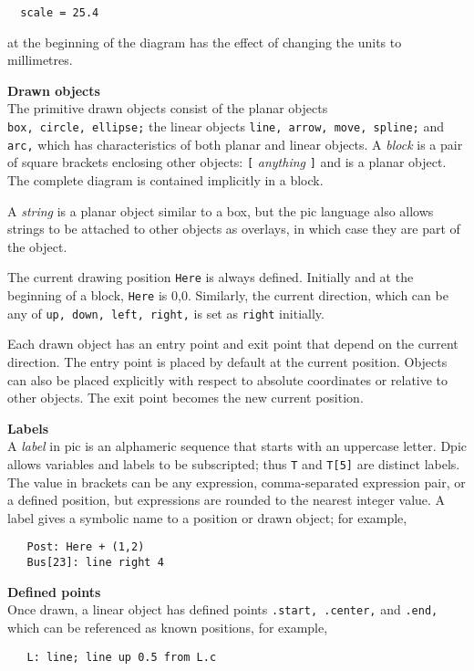 {\tt \ \ scale\ =\ 25.4}

at the beginning of the diagram has the effect of changing
the units to millimetres.
%
\par\hskip-2pc{\bf Drawn objects}\\
The primitive drawn objects consist of the planar objects
{\tt box,\ circle,\ ellipse;}
the linear objects
{\tt line,\ arrow,\ move,\ spline;}
and
{\tt arc,}
which has characteristics of both planar and linear objects.
A
{\it block}
is a pair of square brackets enclosing other objects:
{\tt [}
{\it anything}
{\tt ]}
and is a planar object.
The complete diagram is contained implicitly in a block.

A
{\it string}
is a planar object similar to a box,
but the
pic
language also allows strings to be attached to other objects as overlays,
in which case they are part of the object.

The current drawing position
{\tt Here}
is always defined. 
Initially and at the beginning of a block,
{\tt Here}
is 0,0.
Similarly, the current direction, which can be any of
{\tt up,\ down,\ left,\ right,}
is set as
{\tt right}
initially.

Each drawn object has an entry point and exit point that depend
on the current direction.
The entry point is placed by default at the current position. 
Objects can also be placed explicitly with respect to absolute
coordinates or relative to other objects.
The exit point becomes the new current position.
\par\hskip-2pc{\bf Labels}\\
A
{\it label}
in
pic
is an alphameric sequence that starts with an uppercase letter.
Dpic allows variables and labels to be subscripted; thus
{\tt T}
and
{\tt T[5]}
are distinct labels.
The value in brackets can be any expression, comma-separated
expression pair, or a defined position,
but expressions are rounded to the nearest integer value.
A label gives a symbolic name to a position or drawn object;
for example,

{\tt \ \ \ Post:\ Here\ +\ (1,2)}
\\\hbox{}\hskip-1pt
{\tt \ \ \ Bus[23]:\ line\ right\ 4}
\par\hskip-2pc{\bf Defined points}\\
Once drawn, a linear object has defined points
{\tt .start,\ .center,}
and
{\tt .end,}
which can be referenced as known positions, for example,

{\tt \ \ \ L:\ line;\ line\ up\ 0.5\ from\ L.c}

